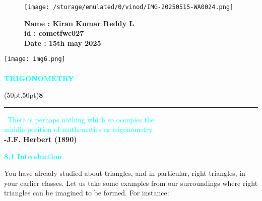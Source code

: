 \documentclass[11pt,a4paper]{article}
\begin{document}
\begin{figure}[h!]
    \begin{minipage}{0.45\textwidth}  %
        \texttt{[image: /storage/emulated/0/vinod/IMG-20250515-WA0024.png]}  %
    \end{minipage} \hfill
    \begin{minipage}{0.45\textwidth}  %
        \textbf{Name : Kiran Kumar Reddy L} \\
    \textbf{id : cometfwc027} \\
  \textbf{Date : 15th may 2025}
    \end{minipage}
\end{figure}
\begin{center}
    \texttt{[image: img6.png]} \\[1em]
    \\
    \vspace{1em}
   \hspace{8em} {\LARGE \textcolor{cyan}{\textbf{TRIGONOMETRY}}}
\vspace{-2cm}
\begin{flushright}
   \begin{minipage}{0.2\textwidth}
   \hspace{4em}\framebox(50pt,50pt){\fontsize{30}{30}\selectfont\textbf{8}}
    \end{minipage}
\end{flushright}
    \noindent\textcolor{cyan}{\rule{\textwidth}{1pt}}
    \item\ \textcolor{cyan}{There is perhaps nothing which so occupies the\\
    middle position of mathematics as trigonometry.}\\
    \hspace{2cm} \textbf{-J.F. Herbert (1890)}
\end{center}

\vspace{1em}
{\large \textcolor{cyan}{\textbf{8.1 Introduction}}}

\vspace{0.5em}
You have already studied about triangles, and in particular, right triangles, in your earlier classes. Let us take some examples from our surroundings where right triangles can be imagined to be formed. For instance:
\end{document}
